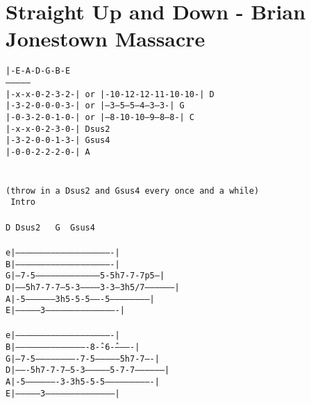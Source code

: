 \newpage
\section{Straight Up and Down - Brian Jonestown Massacre}
\label{Straight Up and Down - Brian Jonestown Massacre}
\texttt{|-E-A-D-G-B-E\\
---------------\\
|-x-x-0-2-3-2-|\ or |-10-12-12-11-10-10-|\ D\\
|-3-2-0-0-0-3-|\ or |--3--5--5--4--3--3-|\ G\\
|-0-3-2-0-1-0-|\ or |--8-10-10--9--8--8-|\ C\\
|-x-x-0-2-3-0-|\ Dsus2\\
|-3-2-0-0-1-3-|\ Gsus4\\
|-0-0-2-2-2-0-|\ A\\
\\
\\
(throw\ in\ a\ Dsus2\ and\ Gsus4\ every\ once\ and\ a\ while)\\
\lbrack\ Intro\rbrack\\
\\
D\ Dsus2\ \ \ G\ \ Gsus4\\
\\
e|----------------------------------------------------------|\\
B|----------------------------------------------------------|\\
G|--7-5---------------------------------------5-5h7-7-7p5---|\\
D|------5h7-7-7---5-3-----------3-3---3h5/7-----------------|\\
A|-5------------------3h5-5-5-------5-----------------------|\\
E|--------------3-------------------------------------------|\\
\\
e|----------------------------------------------------------|\\
B|-------------------------------------------8\^--6\^-----------|\\
G|---7-5-------------------------7-5---------------5h7-7----|\\
D|-------5h7-7-7---5-3---------------5-7-7------------------|\\
A|-5-------------------3-3h5-5-5----------------------------|\\
E|---------------3------------------------------------------|\\
\\
}
